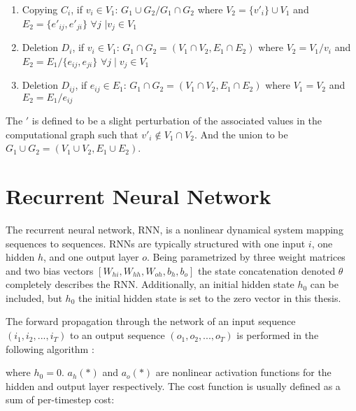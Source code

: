 \begin{enumerate}
    \item Copying $C_i$, if $v_i \in V_1$: $G_1 \cup G_2 / G_1 \cap G_2$ where $V_2 = \{v'_i\} \cup V_1$ and $E_2 = \{e'_{ij}, e'_{ji}\}$ $\forall j$ $\mid v_j \in V_1$
    \item Deletion $D_i $, if $v_i \in V_1$: $G_1 \cap G_2 = (V_1 \cap V_2, E_1 \cap E_2)$ where $V_2 = V_1 / v_i$ and $E_2 = E_1 / \{e_{ij}, e_{ji}\} $ $ \forall j \mid v_j \in V_1 $
    \item Deletion $D_{ij}$, if $e_{ij} \in E_1$: $G_1 \cap G_2 = (V_1 \cap V_2, E_1 \cap E_2)$ where $V_1 = V_2$ and $E_2 = E_1 / e_{ij}$
\end{enumerate}

The $'$ is defined to be a slight perturbation of the associated values in the computational graph such that $v'_i \notin V_1 \cap V_2$. And the union to be $G_1 \cup G_2 = (V_1 \cup V_2, E_1 \cup E_2)$.

\section{Recurrent Neural Network}

The recurrent neural network, RNN, is a nonlinear dynamical system mapping sequences to sequences. RNNs are typically structured with one input $i$, one hidden $h$, and one output layer $o$. Being parametrized by three weight matrices and two bias vectors \([W_{hi}, W_{hh}, W_{oh}, b_h, b_o]\) the state concatenation denoted \(\theta\) completely describes the RNN. Additionally, an initial hidden state $h_0$ can be included, but $h_0$ the initial hidden state is set to the zero vector in this thesis.

The forward propagation through the network of an input sequence \((i_1, i_2, ... , i_T)\) to an output sequence \((o_1, o_2, ..., o_T) \) is performed in the following algorithm \cite{suts}:

\begin{algorithmic}[1]
    \EndFor
\end{algorithmic}

where $h_0 = 0$. $a_h(*)$ and $a_o(*)$ are nonlinear activation functions for the hidden and output layer respectively. The cost function is usually defined as a sum of per-timestep cost:

